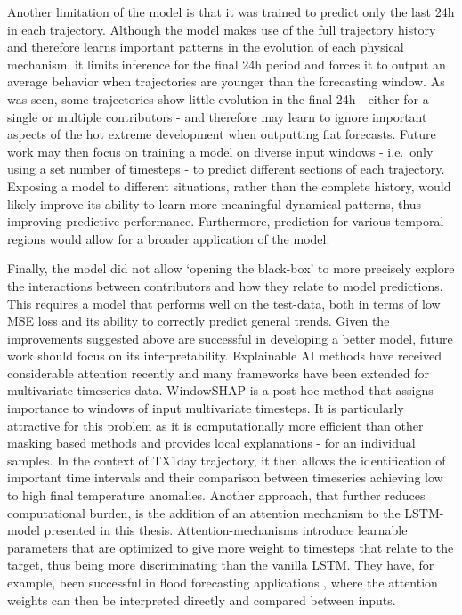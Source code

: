 \documentclass[11pt,a4paper,twoside,openright]{report}
\theoremstyle{definition}
\begin{document}
Another limitation of the model is that it was trained to predict only the last 24h in each trajectory. Although the model makes use of the full trajectory history and therefore learns important patterns in the evolution of each physical mechanism, it limits inference for the final 24h period and forces it to output an average behavior when trajectories are younger than the forecasting window. As was seen, some trajectories show little evolution in the final 24h - either for a single or multiple contributors - and therefore may learn to ignore important aspects of the hot extreme development when outputting flat forecasts. Future work may then focus on training a model on diverse input windows - i.e.~only using a set number of timesteps - to predict different sections of each trajectory. Exposing a model to different situations, rather than the complete history, would likely improve its ability to learn more meaningful dynamical patterns, thus improving predictive performance. Furthermore, prediction for various temporal regions would allow for a broader application of the model.

Finally, the model did not allow `opening the black-box' to more precisely explore the interactions between contributors and how they relate to model predictions. This requires a model that performs well on the test-data, both in terms of low MSE loss and its ability to correctly predict general trends. Given the improvements suggested above are successful in developing a better model, future work should focus on its interpretability. Explainable AI methods have received considerable attention recently and many frameworks have been extended for multivariate timeseries data. WindowSHAP \citep{nayebi_windowshap_2023} is a post-hoc method that assigns importance to windows of input multivariate timesteps. It is particularly attractive for this problem as it is computationally more efficient than other masking based methods \citep[see][for a review]{rojat_explainable_2021} and provides local explanations - for an individual samples. In the context of TX1day trajectory, it then allows the identification of important time intervals and their comparison between timeseries achieving low to high final temperature anomalies. Another approach, that further reduces computational burden, is the addition of an attention mechanism to the LSTM-model presented in this thesis. Attention-mechanisms introduce learnable parameters that are optimized to give more weight to timesteps that relate to the target, thus being more discriminating than the vanilla LSTM. They have, for example, been successful in flood forecasting applications \citep{ding_interpretable_2020}, where the attention weights can then be interpreted directly and compared between inputs.
\cleardoublepage
{}
\end{document}
